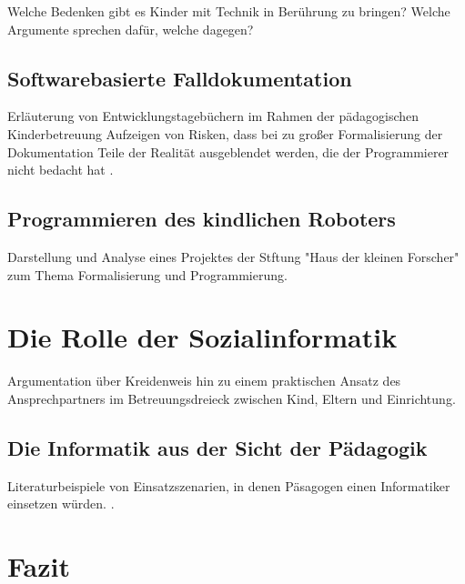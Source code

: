 Welche Bedenken gibt es Kinder mit Technik in Berührung zu bringen? Welche Argumente sprechen dafür, welche 
dagegen?

\section{Softwarebasierte Falldokumentation}

Erläuterung von Entwicklungstagebüchern im Rahmen der pädagogischen Kinderbetreuung 
Aufzeigen von Risken, dass bei zu großer Formalisierung der Dokumentation Teile der Realität ausgeblendet werden, die der Programmierer nicht bedacht hat \citep[vgl.][38 ff]{weber2017}. 

\section{Programmieren des kindlichen Roboters}

Darstellung und Analyse eines Projektes der Stftung "Haus der kleinen Forscher" zum Thema Formalisierung und Programmierung\citep[vgl.][]{roboter}.

\chapter{Die Rolle der Sozialinformatik}

Argumentation über Kreidenweis hin zu einem praktischen Ansatz des Ansprechpartners im Betreuungsdreieck zwischen Kind, Eltern und Einrichtung.

\section{Die Informatik aus der Sicht der Pädagogik}

Literaturbeispiele von Einsatzszenarien, in denen Päsagogen einen Informatiker einsetzen würden. \citep[][41]{Klar2015}. 

\chapter{Fazit}

\blindtext
